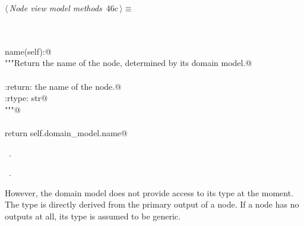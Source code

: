 \documentclass[
    a4paper,      %
    10pt,         %
    openright,    %
    notitlepage,  %
    parskip=half, %
]{scrreprt}       %
\theoremstyle{definition}                    %
\begin{document}
\begin{flushleft} \small
\begin{minipage}{\linewidth}\label{scrap62}\raggedright\small
{} $\langle\,${\itshape Node view model methods}\nobreak\ {\footnotesize {46c}}$\,\rangle\equiv$
\vspace{-1exm}
\begin{list}{}{} \item
\mbox{}\lstinline@@\\
\mbox{}\lstinline@property@\\
\mbox{}\lstinline@def name(self):@\\
\mbox{}\lstinline@    """Return the name of the node, determined by its domain model.@\\
\mbox{}\lstinline@@\\
\mbox{}\lstinline@    :return: the name of the node.@\\
\mbox{}\lstinline@    :rtype: str@\\
\mbox{}\lstinline@    """@\\
\mbox{}\lstinline@@\\
\mbox{}\lstinline@    return self.domain_model.name@\\
\mbox{}\lstinline@@{\NWsep}
\end{list}
\vspace{-1.5ex}
\footnotesize
\begin{list}{}{\setlength{\itemsep}{-\parsep}\setlength{\itemindent}{-\leftmargin}}
\item \NWtxtMacroDefBy\ .
\item \NWtxtMacroRefIn\ .

\item{}
\end{list}
\end{minipage}\vspace{4ex}
\end{flushleft}
However, the domain model does not provide access to its type at the moment. The
type is directly derived from the primary output of a node. If a node has no
outputs at all, its type is assumed to be generic.
\end{document}
